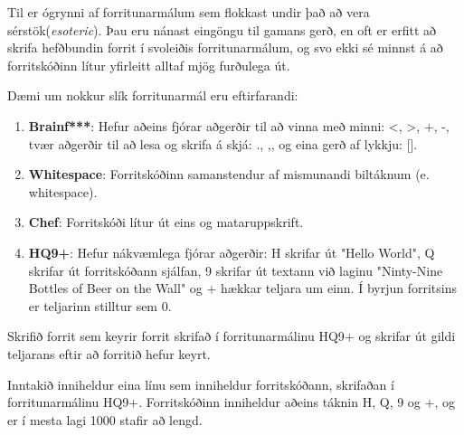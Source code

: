 

Til er ógrynni af forritunarmálum sem flokkast undir það að vera sérstök(\textit{esoteric}). Þau eru nánast eingöngu til gamans gerð, en
oft er erfitt að skrifa hefðbundin forrit í svoleiðis forritunarmálum, og svo
ekki sé minnst á að forritskóðinn lítur yfirleitt alltaf mjög furðulega út.

Dæmi um nokkur slík forritunarmál eru eftirfarandi:

\begin{enumerate}
    \item \textbf{Brainf***}: Hefur aðeins fjórar aðgerðir til að vinna með minni:
    <, >, +, -, tvær aðgerðir til að lesa og skrifa á skjá: ., ,, og eina gerð
    af lykkju: [].
    \item \textbf{Whitespace}: Forritskóðinn samanstendur af mismunandi biltáknum (e.
    whitespace).
    \item \textbf{Chef}: Forritskóði lítur út eins og mataruppskrift.
    \item \textbf{HQ9+}: Hefur nákvæmlega fjórar aðgerðir: H skrifar út "Hello World", Q
    skrifar út forritskóðann sjálfan, 9 skrifar út textann við laginu "Ninty-Nine
    Bottles of Beer on the Wall" og + hækkar teljara um einn. Í byrjun
    forritsins er teljarinn stilltur sem 0.
\end{enumerate}

Skrifið forrit sem keyrir forrit skrifað í forritunarmálinu HQ9+ og skrifar út
gildi teljarans eftir að forritið hefur keyrt.

Inntakið inniheldur eina línu sem inniheldur forritskóðann, skrifaðan í
forritunarmálinu HQ9+. Forritskóðinn inniheldur aðeins táknin H, Q, 9 og +, og er í
mesta lagi 1000 stafir að lengd.
